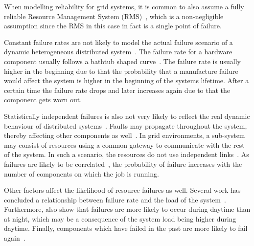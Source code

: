 \documentclass{cslthse-msc}
\begin{document}
When modelling reliability for grid systems, it is common to also assume a fully reliable Resource Management System (RMS)~\cite{relAndPerfGridServices, relGridServicePredConstraint}, which is a non-negligible assumption since the RMS in this case in fact is a single point of failure.


Constant failure rates are not likely to model the actual failure scenario of a dynamic heterogeneous distributed system~\cite{algoMinExTime}. The failure rate for a hardware component usually follows a bathtub shaped curve~\cite{surveyReliabilityDistr}. The failure rate is usually higher in the beginning due to that the probability that a manufacture failure would affect the system is higher in the beginning of the systems lifetime. After a certain time the failure rate drops and later increases again due to that the component gets worn out.

Statistically independent failures is also not very likely to reflect the real dynamic behaviour of distributed systems~\cite{surveyReliabilityDistr, cloudServiceRel}. Faults may propagate throughout the system, thereby affecting other components as well~\cite{relGridSystems}. In grid environments, a sub-system may consist of resources using a common gateway to communicate with the rest of the system. In such a scenario, the resources do not use independent links~\cite{optResourceAllMaxPerformance}. As failures are likely to be correlated~\cite{perfImplPerCheckPoint}, the probability of failure increases with the number of components on which the job is running.

Other factors affect the likelihood of resource failures as well. Several work has concluded a relationship between failure rate and the load of the system~\cite{studyOfFailures, implicationsOfFailures}. Furthermore, \cite{studyOfFailures, implicationsOfFailures} also show that failures are more likely to occur during daytime than at night, which may be a consequence of the system load being higher during daytime. Finally, components which have failed in the past are more likely to fail again~\cite{implicationsOfFailures}.
\end{document}
